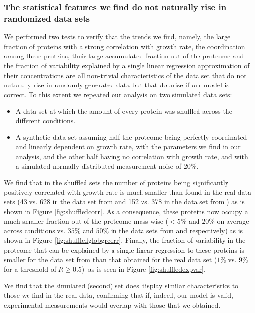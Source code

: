 \subsubsection{The statistical features we find do not naturally rise in randomized data sets}
We performed two tests to verify that the trends we find, namely, the large fraction of proteins with a strong correlation with growth rate, the coordination among these proteins, their large accumulated fraction out of the proteome and the fraction of variability explained by a single linear regression approximation of their concentrations are all non-trivial characteristics of the data set that do not naturally rise in randomly generated data but that do arise if our model is correct.
To this extent we repeated our analysis on two simulated data sets:
\begin{itemize}
\item A data set at which the amount of every protein was shuffled across the different conditions.
\item A synthetic data set assuming half the proteome being perfectly coordinated and linearly dependent on growth rate, with the parameters we find in our analysis, and the other half having no correlation with growth rate, and with a simulated normally distributed measurement noise of $20\%$.
\end{itemize}

We find that in the shuffled sets the number of proteins being significantly positively correlated with
growth rate is much smaller than found in the real data sets (43 vs. 628 in the data set from \cite{Heinemann2015} and 152 vs. 378 in the data set from \cite{Valgepea2013}) as is shown in Figure \ref{fig:shuffledcorr}.
As a consequence, these proteins now occupy a much smaller fraction out of the proteome mass-wise ($<5\%$ and $20\%$ on average across conditions vs. $35\%$ and $50\%$ in the data sets from \cite{Heinemann2015} and \cite{Valgepea2013} respectively) as is shown in Figure \ref{fig:shuffledglobgrcorr}.
Finally, the fraction of variability in the proteome that can be explained by a single linear regression to these proteins is smaller for the data set from \cite{Heinemann2015} than that obtained for the real data set ($1\%$ vs. $9\%$ for a threshold of $R\ge0.5$), as is seen in Figure \ref{fig:shuffledexpvar}.

We find that the simulated (second) set does display similar characteristics to those we find in the real data, confirming that if, indeed, our model is valid, experimental measurements would overlap with those that we obtained.